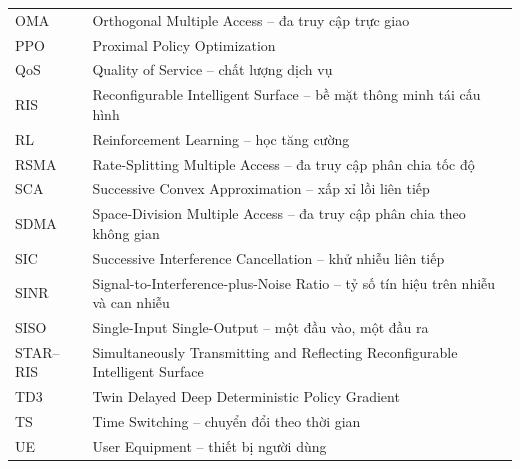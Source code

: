 \begin{longtable}{p{2.4cm}p{11.7cm}}
OMA & Orthogonal Multiple Access -- đa truy cập trực giao\\
PPO & Proximal Policy Optimization\\
QoS & Quality of Service -- chất lượng dịch vụ\\
RIS & Reconfigurable Intelligent Surface -- bề mặt thông minh tái cấu hình\\
RL & Reinforcement Learning -- học tăng cường\\
RSMA & Rate-Splitting Multiple Access -- đa truy cập phân chia tốc độ\\
SCA & Successive Convex Approximation -- xấp xỉ lồi liên tiếp\\
SDMA & Space-Division Multiple Access -- đa truy cập phân chia theo không gian\\
SIC & Successive Interference Cancellation -- khử nhiễu liên tiếp\\
SINR & Signal-to-Interference-plus-Noise Ratio -- tỷ số tín hiệu trên nhiễu và can nhiễu\\
SISO & Single-Input Single-Output -- một đầu vào, một đầu ra\\
STAR--RIS & Simultaneously Transmitting and Reflecting Reconfigurable Intelligent Surface\\
TD3 & Twin Delayed Deep Deterministic Policy Gradient\\
TS & Time Switching -- chuyển đổi theo thời gian\\
UE & User Equipment -- thiết bị người dùng\\
\bottomrule
\end{longtable}
\clearpage

